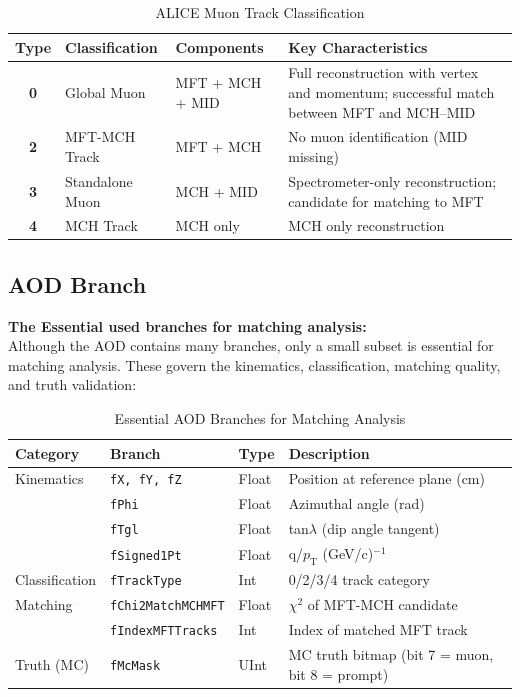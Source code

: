 \documentclass{article}
\begin{document}
\begin{table}[h]
\centering
\caption{ALICE Muon Track Classification}
\label{tab:track_types}
\begin{tabular}{clll}
\toprule
\textbf{Type} & \textbf{Classification} & \textbf{Components} & \textbf{Key Characteristics} \\
\midrule
\textbf{0} & Global Muon & MFT + MCH + MID & Full reconstruction with vertex and momentum; successful match between MFT and MCH--MID \\
\textbf{2} & MFT-MCH Track & MFT + MCH & No muon identification (MID missing) \\
\textbf{3} & Standalone Muon & MCH + MID & Spectrometer-only reconstruction; candidate for matching to MFT \\
\textbf{4} & MCH Track & MCH only & MCH only reconstruction \\
\bottomrule
\end{tabular}
\end{table}

\subsection{AOD Branch}
\textbf{The Essential used branches for matching analysis:}\\
Although the AOD contains many branches, only a small subset is essential for matching analysis. These govern the kinematics, classification, matching quality, and truth validation:

\begin{table}[h]
\centering
\caption{Essential AOD Branches for Matching Analysis}
\label{tab:aod_branches}
\begin{tabular}{>{\raggedright\arraybackslash}p{3cm}>{\raggedright\arraybackslash}p{3cm}ll}
\toprule
\textbf{Category} & \textbf{Branch} & \textbf{Type} & \textbf{Description} \\
\midrule
Kinematics & \texttt{fX, fY, fZ} & Float & Position at reference plane (cm) \\
& \texttt{fPhi} & Float & Azimuthal angle (rad) \\
& \texttt{fTgl} & Float & tan$\lambda$ (dip angle tangent) \\
& \texttt{fSigned1Pt} & Float & q/$p_{\text{T}}$ (GeV/c)$^{-1}$ \\
\midrule
Classification & \texttt{fTrackType} & Int & 0/2/3/4 track category \\
\midrule
Matching & \texttt{fChi2MatchMCHMFT} & Float & $\chi^2$ of MFT-MCH candidate \\
& \texttt{fIndexMFTTracks} & Int & Index of matched MFT track \\
\midrule
Truth (MC) & \texttt{fMcMask} & UInt & MC truth bitmap (bit 7 = muon, bit 8 = prompt) \\
\bottomrule
\end{tabular}
\end{table}
\end{document}
